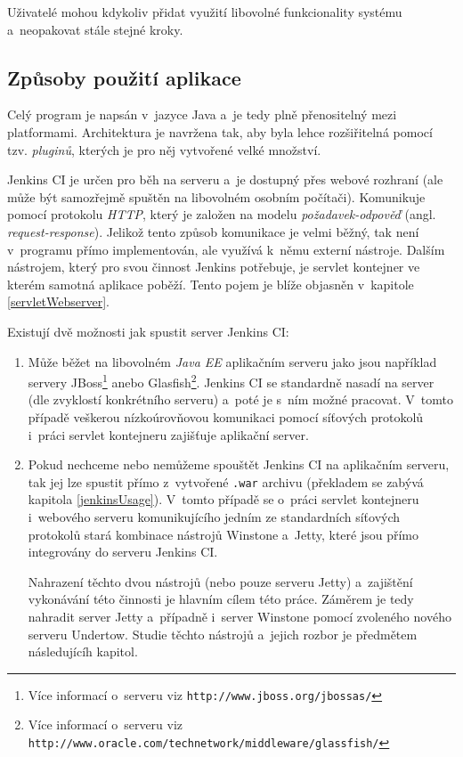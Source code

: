             Uživatelé mohou kdykoliv přidat využití libovolné funkcionality systému a~neopakovat stále stejné kroky. 
            

        \subsection{Způsoby použití aplikace}
            Celý program je napsán v~jazyce Java a~je tedy plně přenositelný mezi platformami. Architektura je navržena tak, aby byla 
            lehce rozšiřitelná pomocí tzv. \emph{pluginů}, kterých je pro něj vytvořené velké množství. 
            
            Jenkins CI je určen pro běh na serveru a~je dostupný přes webové rozhraní (ale může být samozřejmě spuštěn
            na libovolném osobním počítači). Komunikuje pomocí protokolu \emph{HTTP}, 
            který je založen na modelu \emph{požadavek-odpověď} (angl. \emph{request-response}). Jelikož tento způsob komunikace
            je velmi běžný, tak není v~programu přímo implementován, ale využívá k~němu externí nástroje. 
            Dalším nástrojem, který pro svou činnost Jenkins potřebuje, je servlet kontejner ve kterém samotná 
            aplikace poběží.
            Tento pojem je blíže objasněn v~kapitole \ref{servletWebserver}.

            \medskip \noindent
            Existují dvě možnosti jak spustit server Jenkins CI:

            \begin{enumerate}
                \item{Může běžet na libovolném \emph{Java EE} aplikačním serveru \cite{jenkinsServers} jako jsou například servery 
                JBoss\footnote{Více informací o~serveru viz \texttt{http://www.jboss.org/jbossas/}} 
                anebo Glasfish\footnote{Více informací o~serveru viz \texttt{http://www.oracle.com/technetwork/middleware/glassfish/}}}.
                Jenkins CI se standardně nasadí na server (dle zvyklostí konkrétního serveru)
                a~poté je s~ním možné pracovat. V~tomto případě veškerou nízkoúrovňovou komunikaci pomocí síťových protokolů 
                i~práci servlet kontejneru zajišťuje aplikační server.
                
                \item{Pokud nechceme nebo nemůžeme spouštět Jenkins CI na aplikačním serveru, tak jej lze spustit přímo
                    z~vytvořené \texttt{.war} archivu (překladem se zabývá kapitola \ref{jenkinsUsage}). V~tomto případě
                    se o~práci servlet kontejneru i~webového serveru komunikujícího jedním ze standardních síťových protokolů stará 
                    kombinace nástrojů Winstone a~Jetty, které jsou přímo integrovány do serveru Jenkins CI. 
                    
                    Nahrazení těchto dvou nástrojů (nebo pouze serveru Jetty) a~zajištění vykonávání této činnosti je hlavním cílem této práce.
                    Záměrem je tedy nahradit server Jetty a~případně i~server Winstone pomocí zvoleného nového serveru Undertow.
                    Studie těchto nástrojů a~jejich rozbor je předmětem následujícíh kapitol.}
            \end{enumerate}


